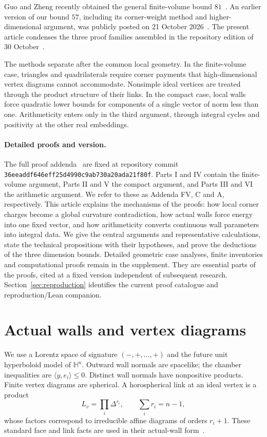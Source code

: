 \documentclass[11pt]{article}
\theoremstyle{remark}\newtheorem{remark}[theorem]{Remark}
\numberwithin{equation}{section}
\newcommand{\HH}{\mathbb H}
\newcommand{\ip}[2]{\langle #1,#2\rangle}
\begin{document}
Guo and Zheng recently obtained the general finite-volume bound
$81$~\cite{GuoZheng2026}. An earlier version of our bound $57$,
including its corner-weight method and higher-dimensional argument,
was publicly posted on 21 October 2026~\cite{FirstDisclosure}.
The present article condenses the three proof families assembled in
the repository edition of 30 October~\cite{Addenda}.

The methods separate after the common local geometry. In the
finite-volume case, triangles and quadrilaterals require corner
payments that high-dimensional vertex diagrams cannot accommodate.
Nonsimple ideal vertices are treated through the product structure
of their links. In the compact case, local walls force quadratic
lower bounds for components of a single vector of norm less than one.
Arithmeticity enters only in the third argument, through integral
cycles and positivity at the other real embeddings.

\paragraph{Detailed proofs and version.}
The full proof addenda~\cite{Addenda} are fixed at repository commit
\texttt{36eeaddf646eff25d4990c9ab730a20ada21f80f}.
Parts I and IV contain the finite-volume argument, Parts II and V
the compact argument, and Parts III and VI the arithmetic argument.
We refer to these as Addenda FV, C and A, respectively. This article explains
the mechanisms of the proofs: how local corner charges become a global
curvature contradiction, how actual walls force energy into one fixed
vector, and how arithmeticity converts continuous wall parameters into
integral data. We give the central arguments and representative calculations,
state the technical propositions with their hypotheses, and prove the
deductions of the three dimension bounds. Detailed geometric case analyses,
finite inventories and computational proofs remain in the supplement.
They are essential parts of the proofs, cited at a fixed version independent
of subsequent research. Section~\ref{sec:reproduction} identifies the
current proof catalogue and reproduction/Lean companion.

\tableofcontents
\medskip

\section{Actual walls and vertex diagrams}\label{sec:geometry}
We use a Lorentz space of signature $(-,+,\ldots,+)$ and the future
unit hyperboloid model of $\HH^n$. Outward wall normals are spacelike;
the chamber inequalities are $\ip{y}{e_i}\le0$. Distinct wall normals
have nonpositive products. Finite vertex diagrams are spherical.
A horospherical link at an ideal vertex is a product
\begin{equation}\label{eq:link}
 L_v=\prod_i\Delta^{r_i},\qquad \sum_i r_i=n-1,
\end{equation}
whose factors correspond to irreducible affine diagrams of orders
$r_i+1$. These standard face and link facts are used in their
actual-wall form~\cite{Vin85,FeliksonTumarkin}.
\end{document}

